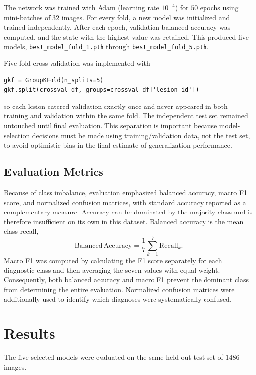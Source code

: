 \documentclass[11pt,a4paper]{article}
\begin{document}
The network was trained with Adam (learning rate $10^{-4}$) for $50$ epochs using mini-batches of $32$ images. For every fold, a new model was initialized and trained independently. After each epoch, validation balanced accuracy was computed, and the state with the highest value was retained. This produced five models, \texttt{best\_model\_fold\_1.pth} through \texttt{best\_model\_fold\_5.pth}.

Five-fold cross-validation was implemented with
\begin{verbatim}
gkf = GroupKFold(n_splits=5)
gkf.split(crossval_df, groups=crossval_df['lesion_id'])
\end{verbatim}
so each lesion entered validation exactly once and never appeared in both training and validation within the same fold. The independent test set remained untouched until final evaluation. This separation is important because model-selection decisions must be made using training/validation data, not the test set, to avoid optimistic bias in the final estimate of generalization performance.

\subsection{Evaluation Metrics}
Because of class imbalance, evaluation emphasized balanced accuracy, macro F1 score, and normalized confusion matrices, with standard accuracy reported as a complementary measure. Accuracy can be dominated by the majority class and is therefore insufficient on its own in this dataset. Balanced accuracy is the mean class recall,
\[
\mathrm{Balanced\ Accuracy}=\frac{1}{7}\sum_{k=1}^{7}\mathrm{Recall}_k.
\]
Macro F1 was computed by calculating the F1 score separately for each diagnostic class and then averaging the seven values with equal weight. Consequently, both balanced accuracy and macro F1 prevent the dominant class from determining the entire evaluation. Normalized confusion matrices were additionally used to identify which diagnoses were systematically confused.

\section{Results}
The five selected models were evaluated on the same held-out test set of $1486$ images.
\end{document}
